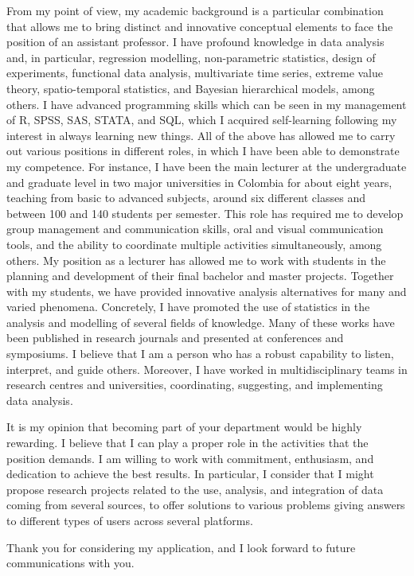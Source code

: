 \documentclass[11pt, a4paper]{awesome-cv}
\begin{document}
\begin{cvletter}
From my point of view, my academic background is a particular combination that allows me to bring distinct and innovative conceptual elements to face the position of an assistant professor. I have profound knowledge in data analysis and, in particular, regression modelling, non-parametric statistics, design of experiments,  functional data analysis, multivariate time series, extreme value theory, spatio-temporal statistics, and  Bayesian hierarchical models, among others. I have advanced programming skills which can be seen in my management of R, SPSS, SAS, STATA, and SQL, which I acquired self-learning following my interest in always learning new things. All of the above has allowed me to carry out various positions in different roles, in which I have been able to demonstrate my competence. For instance, I have been the main lecturer at the undergraduate and graduate level in two major universities in Colombia for about eight years, teaching from basic to advanced subjects, around six different classes and between 100 and 140 students per semester. This role has required me to develop group management and communication skills, oral and visual communication tools, and the ability to coordinate multiple activities simultaneously, among others. My position as a lecturer has allowed me to work with students in the planning and development of their final bachelor and master projects. Together with my students, we have provided innovative analysis alternatives for many and varied phenomena. Concretely, I have promoted the use of statistics in the analysis and modelling of several fields of knowledge. Many of these works have been published in research journals and presented at conferences and symposiums. I believe that I am a person who has a robust capability to listen, interpret, and guide others. Moreover, I have worked in multidisciplinary teams in research centres and universities, coordinating, suggesting, and implementing data analysis. \par
It is my opinion that becoming part of your department would be highly rewarding. I believe that I can play a proper role in the activities that the position demands. I am willing to work with commitment, enthusiasm, and dedication to achieve the best results. In particular, I consider that I might propose research projects related to the use, analysis, and integration of data coming from several sources, to offer solutions to various problems giving answers to different types of users across several platforms.\par\bigskip

Thank you for considering my application, and I look forward to future communications with you.
\end{cvletter}


\makeletterclosing
\end{document}
